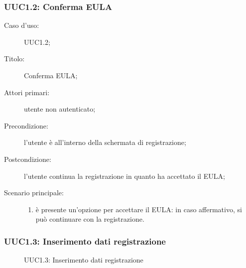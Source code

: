 \documentclass[../../../analisi-dei-requisiti.tex]{subfiles}
\begin{document}
\subsubsection{UUC1.2: Conferma EULA}%
\label{subs:UUC1.2}
\begin{description}
  \item[Caso d’uso:] UUC1.2;
  \item[Titolo:] Conferma EULA\@;
  \item[Attori primari:] utente non autenticato;
  \item[Precondizione:] l'utente è all'interno della schermata di registrazione;
  \item[Postcondizione:] l'utente continua la registrazione in quanto ha accettato il EULA\@;
  \item[Scenario principale:]
        \begin{enumerate}
          \item è presente un'opzione per accettare il EULA\@: in caso affermativo, si può continuare con la registrazione.
        \end{enumerate}
\end{description}

\subsubsection{UUC1.3: Inserimento dati registrazione}%
\label{subs:UUC1.3}

\begin{figure}[H]
  \centering
  \caption{UUC1.3: Inserimento dati registrazione}%
  \label{fig:uuc1_3}
\end{figure}
\end{document}
